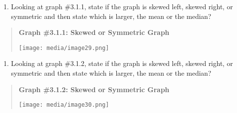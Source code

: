 \documentclass[]{book}
\providecommand{\tightlist}{%
  \setlength{\itemsep}{0pt}\setlength{\parskip}{0pt}}
\begin{document}
\begin{enumerate}
\def\labelenumi{\arabic{enumi}.}
\setcounter{enumi}{8}
\tightlist
\item
  Looking at graph \#3.1.1, state if the graph is skewed left, skewed
  right, or symmetric and then state which is larger, the mean or the
  median?
\end{enumerate}

\begin{quote}
\textbf{Graph \#3.1.1: Skewed or Symmetric Graph}

\texttt{[image: media/image29.png]}
\end{quote}

\begin{enumerate}
\def\labelenumi{\arabic{enumi}.}
\setcounter{enumi}{9}
\tightlist
\item
  Looking at graph \#3.1.2, state if the graph is skewed left, skewed
  right, or symmetric and then state which is larger, the mean or the
  median?
\end{enumerate}

\begin{quote}
\textbf{Graph \#3.1.2: Skewed or Symmetric Graph}

\texttt{[image: media/image30.png]}
\end{quote}
\end{document}
